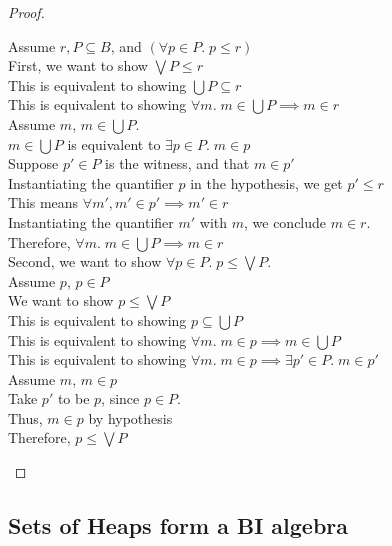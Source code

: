\begin{proof}
\begin{enumerate}
  \begin{tabbedproof}
    \oo Assume $r, P \subseteq B$, and $(\forall p \in P.\; p \leq r)$ \\[1em]
    \ooo First, we want to show $\bigvee P \leq r$ \\
    \oooo This is equivalent to showing $\bigcup P \subseteq r$ \\
    \oooo This is equivalent to showing $\forall m.\; m \in \bigcup P \implies m \in r$ \\
    \oooo Assume $m$, $m \in \bigcup P$. \\
    \ooooo $m \in \bigcup P$ is equivalent to $\exists p \in P.\; m \in p$ \\
    \ooooo Suppose $p' \in P$ is the witness, and that $m \in p'$ \\ 
    \oooooo Instantiating the quantifier $p$ in the hypothesis, we get $p' \leq r$ \\
    \oooooo This means $\forall m', m' \in p' \implies m' \in r$ \\
    \oooooo Instantiating the quantifier $m'$ with $m$,  we conclude $m \in r$.  \\
    \oooo Therefore, $\forall m.\; m \in \bigcup P \implies m \in r$ \\[1em]
    \ooo Second, we want to show $\forall p \in P.\; p \leq \bigvee P$. \\
    \oooo Assume $p$, $p \in P$ \\
    \ooooo We want to show $p \leq \bigvee P$ \\
    \ooooo This is equivalent to showing $p \subseteq \bigcup P$ \\
    \ooooo This is equivalent to showing $\forall m.\; m \in p \implies m \in \bigcup P$ \\
    \ooooo This is equivalent to showing $\forall m.\; m \in p \implies \exists p' \in P.\; m \in p'$ \\
    \ooooo Assume $m$, $m \in p$ \\
    \oooooo Take $p'$ to be $p$, since $p \in P$. \\
    \oooooo Thus, $m \in p$ by hypothesis \\
    \oooo Therefore, $p \leq \bigvee P$ \\
  \end{tabbedproof}

\end{enumerate}


\end{proof}

\subsection{Sets of Heaps form a BI algebra}

